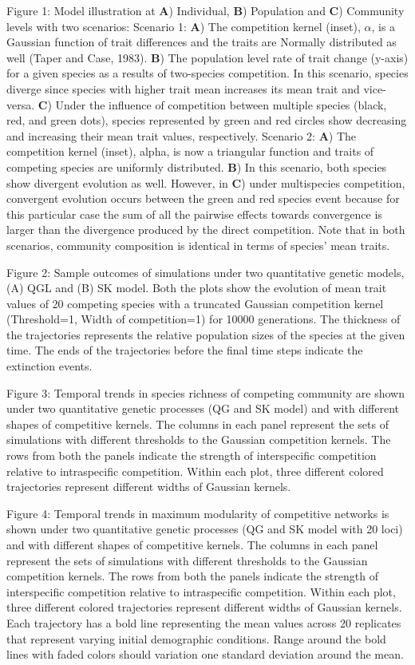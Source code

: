 \documentclass[12pt]{article}
\begin{document}
\noindent Figure 1: Model illustration at {\bf A}) Individual, {\bf B}) Population and {\bf C}) Community levels with two scenarios: Scenario 1: {\bf A}) The competition kernel (inset), $\alpha$, is a Gaussian function of trait differences and the traits are Normally distributed as well (Taper and Case, 1983). {\bf B}) The population level rate of trait change (y-axis) for a given species as a results of two-species competition. In this scenario, species diverge since species with higher trait mean increases its mean trait and vice-versa. {\bf C}) Under the influence of competition between multiple species (black, red, and green dots), species represented by green and red circles show decreasing and increasing their mean trait values, respectively. Scenario 2: {\bf A}) The competition kernel (inset), alpha, is now a triangular function and traits of competing species are uniformly distributed. {\bf B}) In this scenario, both species show divergent evolution as well. However, in {\bf C}) under multispecies competition, convergent evolution occurs between the green and red species event because for this particular case the sum of all the pairwise effects towards convergence is larger than the divergence produced by the direct competition. Note that in both scenarios, community composition is identical in terms of species' mean traits.

\noindent Figure 2: Sample outcomes of simulations under two quantitative genetic models, (A) QGL and (B) SK model. Both the plots show the evolution of mean trait values of 20 competing species with a truncated Gaussian competition kernel (Threshold=1, Width of competition=1) for 10000 generations.  The thickness of the trajectories represents the relative population sizes of the species at the given time. The ends of the trajectories before the final time steps indicate the extinction events.

\noindent Figure 3: Temporal trends in species richness of competing community are shown under two quantitative genetic processes (QG and SK model) and with different shapes of competitive kernels. The columns in each panel represent the sets of simulations with different thresholds to the Gaussian competition kernels. The rows from both the panels indicate the strength of interspecific competition relative to intraspecific competition. Within each plot, three different colored trajectories represent different widths of Gaussian kernels.

\noindent Figure 4: Temporal trends in maximum modularity of competitive networks is shown under two quantitative genetic processes (QG and SK model with 20 loci) and with different shapes of competitive kernels. The columns in each panel represent the sets of simulations with different thresholds to the Gaussian competition kernels. The rows from both the panels indicate the strength of interspecific competition relative to intraspecific competition. Within each plot, three different colored trajectories represent different widths of Gaussian kernels. Each trajectory has a bold line representing the mean values across 20 replicates that represent varying initial demographic conditions. Range around the bold lines with faded colors should variation one standard deviation around the mean.  
\end{document}
